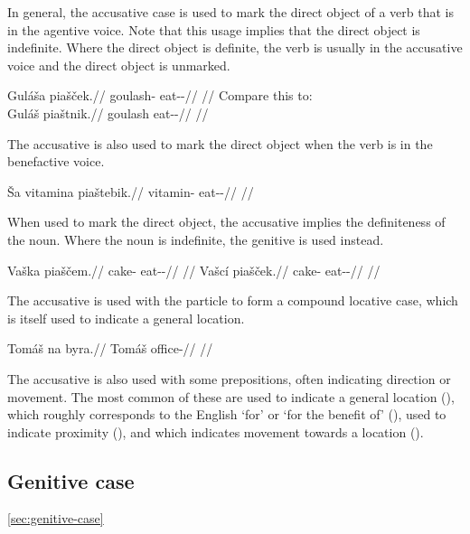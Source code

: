 In general, the accusative case is used to mark the direct object of a verb that is in the agentive voice. Note that this usage implies that the direct object is indefinite. Where the direct object is definite, the verb is usually in the accusative voice and the direct object is unmarked.

\pex
\a \begingl
\gla Guláša piašček.//
\glb goulash-\Acc{} eat-\Av{}-\Pf{}//
\glft {}//
\endgl
\a Compare this to:\\
\begingl
\gla Guláš piaštnik.//
\glb goulash eat-\Pv{}-\Pf{}//
\glft {}//
\endgl
\xe

The accusative is also used to mark the direct object when the verb is in the benefactive voice.

\pex
\begingl
\gla Ša vitamina piaštebik.//
\glb {} vitamin-\Acc{} eat-\Ben{}-\Pf{}//
\glft {}//
\endgl
\xe


When used to mark the direct object, the accusative implies the definiteness of the noun. Where the noun is indefinite, the genitive is used instead.

\pex
\a\begingl
\gla Vaška piaščem.//
\glb cake-\Acc{} eat-\Av{}-\Pf{}//
\glft {}//
\endgl
\a\begingl
\gla Vašcí piašček.//
\glb cake-\Gen{} eat-\Av{}-\Pf{}//
\glft {}//
\endgl
\xe

The accusative is used with the particle  to form a compound locative case, which is itself used to indicate a general location.

\pex
\begingl
\gla Tomáš na byra.//
\glb Tomáš \Loc{} office-\Acc{}//
\glft {}//
\endgl
\xe

The accusative is also used with some prepositions, often indicating direction or movement. The most common of these are  used to indicate a general location (),  which roughly corresponds to the English `for' or `for the benefit of' (),  used to indicate proximity (), and  which indicates movement towards a location ().

\subsection{Genitive case}\ref{sec:genitive-case}

